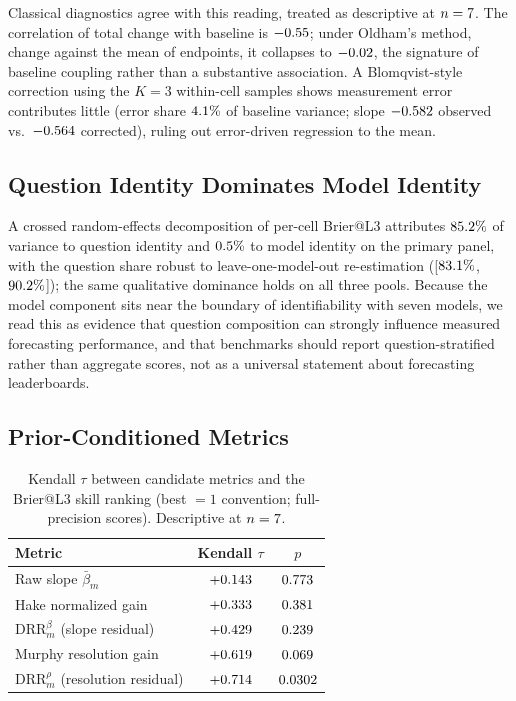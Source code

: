 \documentclass[conference]{IEEEtran}
\theoremstyle{plain}
\theoremstyle{remark}
\begin{document}
Classical diagnostics agree with this reading, treated as descriptive at $n=7$. The correlation of total change with baseline is $-0.55$; under Oldham's method, change against the mean of endpoints, it collapses to $-0.02$, the signature of baseline coupling rather than a substantive association. A Blomqvist-style correction using the $K{=}3$ within-cell samples shows measurement error contributes little (error share $4.1\%$ of baseline variance; slope $-0.582$ observed vs.\ $-0.564$ corrected), ruling out error-driven regression to the mean.

\subsection{Question Identity Dominates Model Identity}

A crossed random-effects decomposition of per-cell Brier@L3 attributes $85.2\%$ of variance to question identity and $0.5\%$ to model identity on the primary panel, with the question share robust to leave-one-model-out re-estimation ([$83.1\%$, $90.2\%$]); the same qualitative dominance holds on all three pools. Because the model component sits near the boundary of identifiability with seven models, we read this as evidence that question composition can strongly influence measured forecasting performance, and that benchmarks should report question-stratified rather than aggregate scores, not as a universal statement about forecasting leaderboards.

\subsection{Prior-Conditioned Metrics}
\label{sec:metrics}

\begin{table}[t]
  \centering
  \footnotesize
  \setlength{\tabcolsep}{4pt}
  \caption{Kendall $\tau$ between candidate metrics and the Brier@L3 skill ranking (best $=1$ convention; full-precision scores). Descriptive at $n=7$.}
  \label{tab:alternatives}
  \begin{tabular}{lcc}
    \toprule
    Metric & Kendall $\tau$ & $p$ \\
    \midrule
    Raw slope $\bar\beta_m$                & $+0.143$      & $0.773$ \\
    Hake normalized gain                   & $+0.333$                     & $0.381$ \\
    $\mathrm{DRR}^{\beta}_m$ (slope residual)      & $+0.429$   & $0.239$ \\
    Murphy resolution gain                 & $+0.619$  & $0.069$ \\
    $\mathrm{DRR}^{\rho}_m$ (resolution residual)  & $+0.714$     & $0.0302$ \\
    \bottomrule
  \end{tabular}
\end{table}
\end{document}
